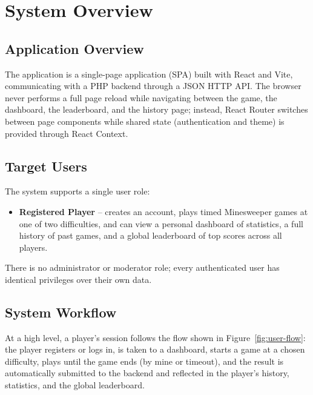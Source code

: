 \chapter{System Overview}
\label{ch:overview}

\section{Application Overview}
The application is a single-page application (SPA) built with React and
Vite, communicating with a PHP backend through a JSON HTTP API. The browser
never performs a full page reload while navigating between the game, the
dashboard, the leaderboard, and the history page; instead, React Router
switches between page components while shared state (authentication and
theme) is provided through React Context.

\section{Target Users}
The system supports a single user role:
\begin{itemize}[nosep]
    \item \textbf{Registered Player} -- creates an account, plays timed
    Minesweeper games at one of two difficulties, and can view a personal
    dashboard of statistics, a full history of past games, and a global
    leaderboard of top scores across all players.
\end{itemize}
There is no administrator or moderator role; every authenticated user has
identical privileges over their own data.

\section{System Workflow}
At a high level, a player's session follows the flow shown in
Figure~\ref{fig:user-flow}: the player registers or logs in, is taken to a
dashboard, starts a game at a chosen difficulty, plays until the game ends
(by mine or timeout), and the result is automatically submitted to the
backend and reflected in the player's history, statistics, and the global
leaderboard.


